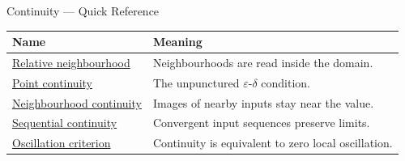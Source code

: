 \begin{toolkitbox}{Continuity --- Quick Reference}
\small
\begin{tabular}{l l}
\toprule
\textbf{Name} & \textbf{Meaning}\\
\midrule
\hyperref[def:relative-neighborhood]{Relative neighbourhood} & Neighbourhoods are read inside the domain.\\
\hyperref[def:continuous-at-point]{Point continuity} & The unpunctured $\varepsilon$-$\delta$ condition.\\
\hyperref[def:continuous-at-point-nbhd]{Neighbourhood continuity} & Images of nearby inputs stay near the value.\\
\hyperref[def:continuous-at-point-seq]{Sequential continuity} & Convergent input sequences preserve limits.\\
\hyperref[thm:continuity-iff-zero-oscillation]{Oscillation criterion} & Continuity is equivalent to zero local oscillation.\\
\bottomrule
\end{tabular}
\end{toolkitbox}





